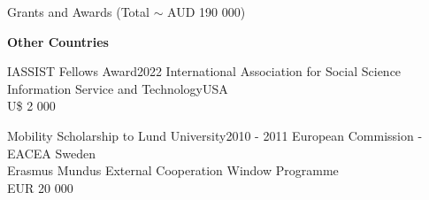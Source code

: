 \begin{rSection}{Grants and Awards (Total $\sim$ AUD 190 000)}
\vspace{1em}

\begin{center}
\large \textbf {Other Countries}
\end{center}

\par

\begin{rSubsection}
{IASSIST Fellows Award}{2022}
{International Association for Social Science Information Service and Technology}{USA}\\
{U\$ 2 000}
\end{rSubsection}

\begin{rSubsection}
{Mobility Scholarship to Lund University}{2010 - 2011}
{European Commission - EACEA} {Sweden}\\
{Erasmus Mundus External Cooperation Window Programme}\\
{EUR 20 000}\\
\end{rSubsection}

\end{rSection}
